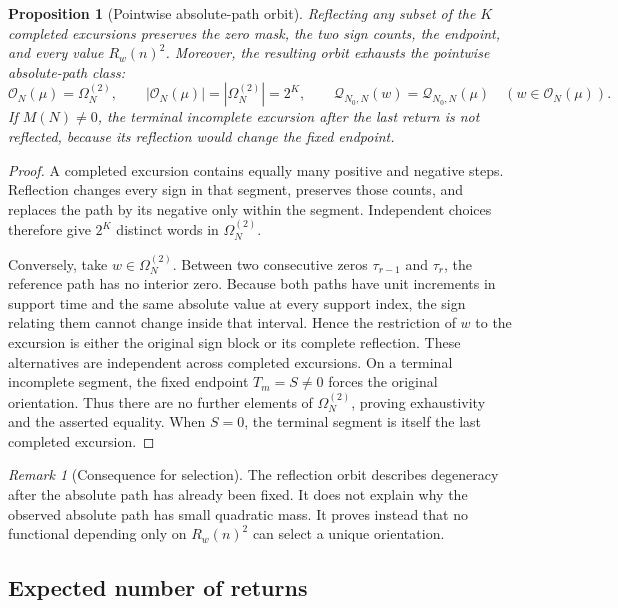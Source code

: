 \documentclass[11pt,reqno]{amsart}
\numberwithin{equation}{section}
\theoremstyle{plain}
\newtheorem{proposition}[theorem]{Proposition}
\theoremstyle{definition}
\theoremstyle{remark}
\newtheorem{remark}[theorem]{Remark}
\newcommand{\Om}{\Omega}
\newcommand{\QF}{\mathcal Q}
\newcommand{\cO}{\mathcal O}
\begin{document}
\begin{proposition}[Pointwise absolute-path orbit]
\label{prop:reflection-orbit}
Reflecting any subset of the \(K\) completed excursions preserves the zero
mask, the two sign counts, the endpoint, and every value \(R_w(n)^2\).
Moreover, the resulting orbit exhausts the pointwise absolute-path class:
\begin{equation}
\cO_N(\mu)=\Om_N^{(2)},\qquad
|\cO_N(\mu)|=|\Om_N^{(2)}|=2^K,\qquad
\QF_{N_0,N}(w)=\QF_{N_0,N}(\mu)
\quad(w\in\cO_N(\mu)).
\label{eq:reflection-orbit-size}
\end{equation}
If \(M(N)\neq0\), the terminal incomplete excursion after the last return is
not reflected, because its reflection would change the fixed endpoint.
\end{proposition}

\begin{proof}
A completed excursion contains equally many positive and negative steps.
Reflection changes every sign in that segment, preserves those counts, and
replaces the path by its negative only within the segment.  Independent
choices therefore give \(2^K\) distinct words in \(\Om_N^{(2)}\).

Conversely, take \(w\in\Om_N^{(2)}\).  Between two consecutive zeros
\(\tau_{r-1}\) and \(\tau_r\), the reference path has no interior zero.
Because both paths have unit increments in support time and the same absolute
value at every support index, the sign relating them cannot change inside
that interval.  Hence the restriction of \(w\) to the excursion is either
the original sign block or its complete reflection.  These alternatives are
independent across completed excursions.  On a terminal incomplete segment,
the fixed endpoint \(T_m=S\neq0\) forces the original orientation.  Thus
there are no further elements of \(\Om_N^{(2)}\), proving exhaustivity and
the asserted equality.  When \(S=0\), the terminal segment is itself the
last completed excursion.
\end{proof}

\begin{remark}[Consequence for selection]
\label{rem:reflection-selection-limit}
The reflection orbit describes degeneracy after the absolute path has already
been fixed.  It does not explain why the observed absolute path has small
quadratic mass.  It proves instead that no functional depending only on
\(R_w(n)^2\) can select a unique orientation.
\end{remark}

\subsection{Expected number of returns}
\label{subsec:expected-return-count}
\end{document}

